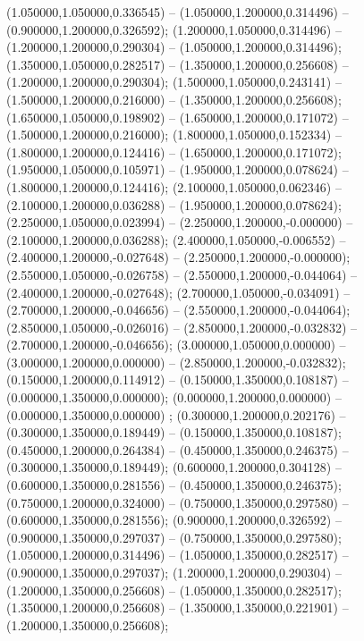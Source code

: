  (1.050000,1.050000,0.336545) -- (1.050000,1.200000,0.314496) -- (0.900000,1.200000,0.326592);
 (1.200000,1.050000,0.314496) -- (1.200000,1.200000,0.290304) -- (1.050000,1.200000,0.314496);
 (1.350000,1.050000,0.282517) -- (1.350000,1.200000,0.256608) -- (1.200000,1.200000,0.290304);
 (1.500000,1.050000,0.243141) -- (1.500000,1.200000,0.216000) -- (1.350000,1.200000,0.256608);
 (1.650000,1.050000,0.198902) -- (1.650000,1.200000,0.171072) -- (1.500000,1.200000,0.216000);
 (1.800000,1.050000,0.152334) -- (1.800000,1.200000,0.124416) -- (1.650000,1.200000,0.171072);
 (1.950000,1.050000,0.105971) -- (1.950000,1.200000,0.078624) -- (1.800000,1.200000,0.124416);
 (2.100000,1.050000,0.062346) -- (2.100000,1.200000,0.036288) -- (1.950000,1.200000,0.078624);
 (2.250000,1.050000,0.023994) -- (2.250000,1.200000,-0.000000) -- (2.100000,1.200000,0.036288);
 (2.400000,1.050000,-0.006552) -- (2.400000,1.200000,-0.027648) -- (2.250000,1.200000,-0.000000);
 (2.550000,1.050000,-0.026758) -- (2.550000,1.200000,-0.044064) -- (2.400000,1.200000,-0.027648);
 (2.700000,1.050000,-0.034091) -- (2.700000,1.200000,-0.046656) -- (2.550000,1.200000,-0.044064);
 (2.850000,1.050000,-0.026016) -- (2.850000,1.200000,-0.032832) -- (2.700000,1.200000,-0.046656);
 (3.000000,1.050000,0.000000) -- (3.000000,1.200000,0.000000) -- (2.850000,1.200000,-0.032832);
 (0.150000,1.200000,0.114912) -- (0.150000,1.350000,0.108187) -- (0.000000,1.350000,0.000000);
 (0.000000,1.200000,0.000000) -- (0.000000,1.350000,0.000000) ;
 (0.300000,1.200000,0.202176) -- (0.300000,1.350000,0.189449) -- (0.150000,1.350000,0.108187);
 (0.450000,1.200000,0.264384) -- (0.450000,1.350000,0.246375) -- (0.300000,1.350000,0.189449);
 (0.600000,1.200000,0.304128) -- (0.600000,1.350000,0.281556) -- (0.450000,1.350000,0.246375);
 (0.750000,1.200000,0.324000) -- (0.750000,1.350000,0.297580) -- (0.600000,1.350000,0.281556);
 (0.900000,1.200000,0.326592) -- (0.900000,1.350000,0.297037) -- (0.750000,1.350000,0.297580);
 (1.050000,1.200000,0.314496) -- (1.050000,1.350000,0.282517) -- (0.900000,1.350000,0.297037);
 (1.200000,1.200000,0.290304) -- (1.200000,1.350000,0.256608) -- (1.050000,1.350000,0.282517);
 (1.350000,1.200000,0.256608) -- (1.350000,1.350000,0.221901) -- (1.200000,1.350000,0.256608);
